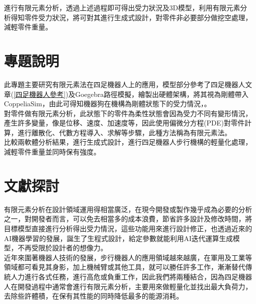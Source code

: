 進行有限元素分析，透過上述過程即可得出受力狀況及3D模型，利用有限元素分析得知零件受力狀況，將可對其進行生成式設計，對零件非必要部分做挖空處理，減輕零件重量。\
\newpage
\section{專題說明}
此專題主要研究有限元素法在四足機器人上的應用，模型部分參考了四足機器人文章(\ref {四足機器人參考})及Goegebra路徑模擬，繪製出硬體架構，將其視為剛體帶入CoppeliaSim，由此可得知機器狗在機構為剛體狀態下的受力情況，。\\

對零件做有限元素分析，此狀態下的零件為柔性狀態會因為受力不同有變形情況，產生許多變量，像是位移、速度、加速度等，因此使用偏微分方程(PDE)對零件計算，進行離散化、代數方程導入、求解等步驟，此種方法稱為有限元素法。\\

比較兩軟體分析結果，進行生成式設計，進行四足機器人步行機構的輕量化處理，減輕零件重量並同時保有強度。\\

\section{文獻探討}

有限元素分析在設計領域運用得相當廣泛，在現今開發或製作幾乎成為必要的分析之一，對開發者而言，可以免去相當多的成本浪費，節省許多設計及修改時間，將目標模型直接進行分析得出受力情況，這些功能用來進行設計修正，也透過近來的AI機器學習的發展，誕生了生程式設計，給定參數就能利用AI迭代運算生成模型，不再受限於設計者的想像力。\\

近年來圍著機器人技術的發展，步行機器人的應用領域越來越廣，在軍用及工業等領域都可看見其身影，加上機械臂或其他工具，就可以勝任許多工作，漸漸替代傳統人力進行各式任務，進行高危或負重工作，因此我們將兩種結合，因為四足機器人在開發過程中通常會進行有限元素分析，主要用來做輕量化並找出最大負荷力，去除些許體積，在保有其性能的同時降低最多的能源消耗。\
\newpage

\renewcommand{\baselinestretch}{0.5} %
